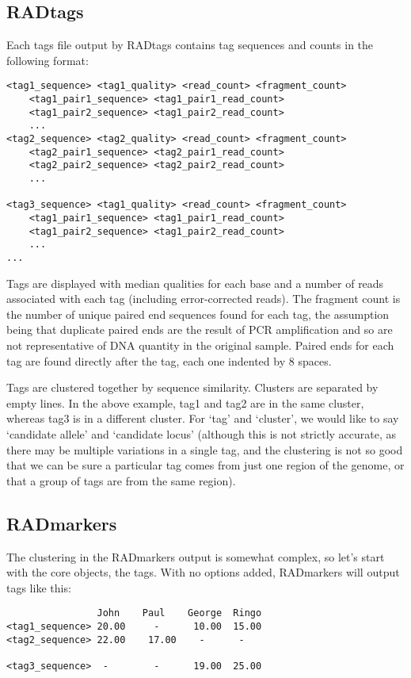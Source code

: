 \documentclass[a4paper]{article}
\begin{document}
\subsection{RADtags}

Each tags file output by RADtags contains tag sequences and counts in the following format:

\begin{verbatim}
<tag1_sequence> <tag1_quality> <read_count> <fragment_count>
    <tag1_pair1_sequence> <tag1_pair1_read_count>
    <tag1_pair2_sequence> <tag1_pair2_read_count>
    ...
<tag2_sequence> <tag2_quality> <read_count> <fragment_count>
    <tag2_pair1_sequence> <tag2_pair1_read_count>
    <tag2_pair2_sequence> <tag2_pair2_read_count>
    ...

<tag3_sequence> <tag1_quality> <read_count> <fragment_count>
    <tag1_pair1_sequence> <tag1_pair1_read_count>
    <tag1_pair2_sequence> <tag1_pair2_read_count>
    ...
...
\end{verbatim}

Tags are displayed with median qualities for each base and a number of reads associated with each tag (including error-corrected reads). The fragment count is the number of unique paired end sequences found for each tag, the assumption being that duplicate paired ends are the result of PCR amplification and so are not representative of DNA quantity in the original sample. Paired ends for each tag are found directly after the tag, each one indented by 8 spaces.

Tags are clustered together by sequence similarity. Clusters are separated by empty lines. In the above example, tag1 and tag2 are in the same cluster, whereas tag3 is in a different cluster. For `tag' and `cluster', we would like to say `candidate allele' and `candidate locus' (although this is not strictly accurate, as there may be multiple variations in a single tag, and the clustering is not so good that we can be sure a particular tag comes from just one region of the genome, or that a group of tags are from the same region).


\subsection{RADmarkers}

The clustering in the RADmarkers output is somewhat complex, so let's start with the core objects, the tags. With no options added, RADmarkers will output tags like this:

\begin{verbatim}
                John    Paul    George  Ringo
<tag1_sequence> 20.00     -      10.00  15.00
<tag2_sequence> 22.00    17.00    -      -

<tag3_sequence>  -        -      19.00  25.00
\end{verbatim}
\end{document}
